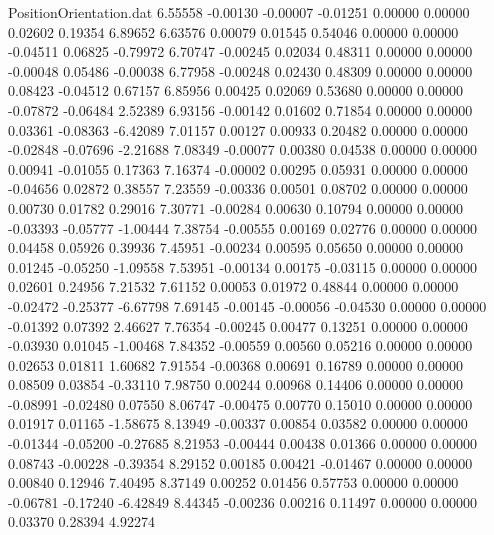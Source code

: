 \begin{filecontents}{PositionOrientation.dat}
   6.55558   -0.00130   -0.00007    -0.01251    0.00000    0.00000    0.02602    0.19354    6.89652
   6.63576    0.00079    0.01545     0.54046    0.00000    0.00000   -0.04511    0.06825   -0.79972
   6.70747   -0.00245    0.02034     0.48311    0.00000    0.00000   -0.00048    0.05486   -0.00038
   6.77958   -0.00248    0.02430     0.48309    0.00000    0.00000    0.08423   -0.04512    0.67157
   6.85956    0.00425    0.02069     0.53680    0.00000    0.00000   -0.07872   -0.06484    2.52389
   6.93156   -0.00142    0.01602     0.71854    0.00000    0.00000    0.03361   -0.08363   -6.42089
   7.01157    0.00127    0.00933     0.20482    0.00000    0.00000   -0.02848   -0.07696   -2.21688
   7.08349   -0.00077    0.00380     0.04538    0.00000    0.00000    0.00941   -0.01055    0.17363
   7.16374   -0.00002    0.00295     0.05931    0.00000    0.00000   -0.04656    0.02872    0.38557
   7.23559   -0.00336    0.00501     0.08702    0.00000    0.00000    0.00730    0.01782    0.29016
   7.30771   -0.00284    0.00630     0.10794    0.00000    0.00000   -0.03393   -0.05777   -1.00444
   7.38754   -0.00555    0.00169     0.02776    0.00000    0.00000    0.04458    0.05926    0.39936
   7.45951   -0.00234    0.00595     0.05650    0.00000    0.00000    0.01245   -0.05250   -1.09558
   7.53951   -0.00134    0.00175    -0.03115    0.00000    0.00000    0.02601    0.24956    7.21532
   7.61152    0.00053    0.01972     0.48844    0.00000    0.00000   -0.02472   -0.25377   -6.67798
   7.69145   -0.00145   -0.00056    -0.04530    0.00000    0.00000   -0.01392    0.07392    2.46627
   7.76354   -0.00245    0.00477     0.13251    0.00000    0.00000   -0.03930    0.01045   -1.00468
   7.84352   -0.00559    0.00560     0.05216    0.00000    0.00000    0.02653    0.01811    1.60682
   7.91554   -0.00368    0.00691     0.16789    0.00000    0.00000    0.08509    0.03854   -0.33110
   7.98750    0.00244    0.00968     0.14406    0.00000    0.00000   -0.08991   -0.02480    0.07550
   8.06747   -0.00475    0.00770     0.15010    0.00000    0.00000    0.01917    0.01165   -1.58675
   8.13949   -0.00337    0.00854     0.03582    0.00000    0.00000   -0.01344   -0.05200   -0.27685
   8.21953   -0.00444    0.00438     0.01366    0.00000    0.00000    0.08743   -0.00228   -0.39354
   8.29152    0.00185    0.00421    -0.01467    0.00000    0.00000    0.00840    0.12946    7.40495
   8.37149    0.00252    0.01456     0.57753    0.00000    0.00000   -0.06781   -0.17240   -6.42849
   8.44345   -0.00236    0.00216     0.11497    0.00000    0.00000    0.03370    0.28394    4.92274

\end{filecontents}
